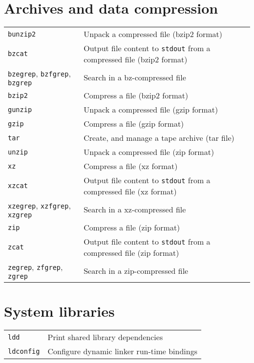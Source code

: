 \documentclass[10pt]{article}
\begin{document}
\newpage

\cheatsheet

\begin{multicols}{2} 

\section{Archives and data compression}

\begin{tabular}{ p{2.5cm} p{8.5cm} }
  \hline 
  \texttt{bunzip2} & Unpack a compressed file (bzip2 format) \\
  \rowcolor{Gray}
  \texttt{bzcat} & Output file content to \texttt{stdout} from a compressed file (bzip2 format)\\
  \texttt{bzegrep}, \texttt{bzfgrep}, \texttt{bzgrep} & Search in a bz-compressed file \\
  \rowcolor{Gray}
  \texttt{bzip2} & Compress a file (bzip2 format) \\
  \texttt{gunzip} & Unpack a compressed file (gzip format) \\
  \rowcolor{Gray}
  \texttt{gzip} & Compress a file (gzip format) \\
  \texttt{tar} & Create, and manage a tape archive (tar file) \\
  \rowcolor{Gray}
  \texttt{unzip} & Unpack a compressed file (zip format) \\
  \texttt{xz} & Compress a file (xz format) \\
  \rowcolor{Gray}
  \texttt{xzcat} & Output file content to \texttt{stdout} from a compressed file (xz format) \\
  \texttt{xzegrep}, \texttt{xzfgrep}, \texttt{xzgrep} & Search in a xz-compressed file \\
  \rowcolor{Gray}
  \texttt{zip} & Compress a file (zip format) \\
  \texttt{zcat} & Output file content to \texttt{stdout} from a compressed file (zip format) \\
  \rowcolor{Gray}
  \texttt{zegrep}, \texttt{zfgrep}, \texttt{zgrep} & Search in a zip-compressed file \\
  \hline
\end{tabular}

\section{System libraries}
\begin{tabular}{ p{2.5cm} p{8.5cm} }
  \hline 
  \texttt{ldd} & Print shared library dependencies \\
  \rowcolor{Gray}
  \texttt{ldconfig} & Configure dynamic linker run-time bin\-dings
  \\
  \hline
\end{tabular}


\end{multicols}
\end{document}
